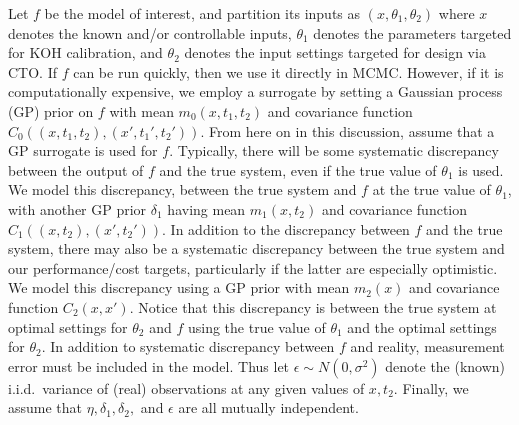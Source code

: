 \documentclass[12pt]{article}
\begin{document}
%
Let $f$ be the model of interest, and partition its inputs as $(x,\theta_1,\theta_2)$ where $x$ denotes the known and/or controllable inputs, $\theta_1$ denotes the parameters targeted for KOH calibration, and $\theta_2$ denotes the input settings targeted for design via CTO.
%
If $f$ can be run quickly, then we use it directly in MCMC.
%
However, if it is computationally expensive, we employ a surrogate by setting a Gaussian process (GP) prior on $f$ with mean $m_0(x,t_1,t_2)$ and covariance function $C_0((x,t_1,t_2),(x',t_1',t_2'))$.
%
From here on in this discussion, assume that a GP surrogate is used for $f$.
%
Typically, there will be some systematic discrepancy between the output of $f$ and the true system, even if the true value of $\theta_1$ is used.
%
We model this discrepancy, between the true system and $f$ at the true value of $\theta_1$, with another GP prior $\delta_1$ having mean $m_1(x,t_2)$ and covariance function $C_1((x,t_2),(x',t_2'))$.
%
In addition to the discrepancy between $f$ and the true system, there may also be a systematic discrepancy between the true system and our performance/cost targets, particularly if the latter are especially optimistic.
%
We model this discrepancy using a GP prior with mean $m_2(x)$ and covariance function $C_2(x,x')$.
%
Notice that this discrepancy is between the true system at optimal settings for $\theta_2$ and $f$ using the true value of $\theta_1$ and the optimal settings for $\theta_2$.
%
In addition to systematic discrepancy between $f$ and reality, measurement error must be included in the model.
%
Thus let $\epsilon\sim N(0,\sigma^2)$ denote the (known) i.i.d.\ variance of (real) observations at any given values of $x,t_2$.
%
Finally, we assume that $\eta,\delta_1,\delta_2,$ and $\epsilon$ are all mutually independent.
%
\end{document}
